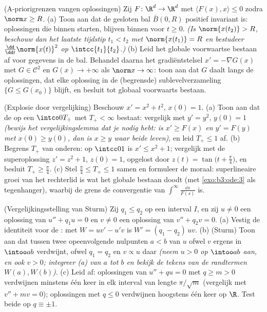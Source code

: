 \begin{exercise}[$\star\star\star$]\label{exo:b3:ode:10}
(A-priorigrenzen vangen oplossingen) Zij $F \colon \R^d \to \R^d$
 met $\langle F(x), x\rangle \leq 0$ zodra
$\norm x \geq R$.
(a) Toon aan dat de gesloten bal $\bar B(0, R)$ positief
invariant is: oplossingen die binnen starten, blijven binnen voor
$t \geq 0$. \emph{(Is $\norm{x(t_2)} > R$, beschouw dan het
laatste tijdstip $t_1 < t_2$ met $\norm{x(t_1)} = R$ en bestudeer
$\frac{\dd}{\dd t}\norm{x(t)}^2$ op $\intcc{t_1}{t_2}$.)}
(b) Leid het globale voorwaartse bestaan af voor gegevens in de
bal. Behandel daarna het gradiëntstelsel $x' = -\nabla G(x)$ met
$G \in \mathcal C^2$ en $G(x) \to +\infty$ als $\norm x \to
\infty$: toon aan dat $G$ daalt langs de oplossingen, dat elke
oplossing in de (begrensde) sublevelverzameling $\{G \leq
G(x_0)\}$ blijft, en besluit tot globaal voorwaarts bestaan.
\end{exercise}

\begin{exercise}[$\star\star$]\label{exo:b3:ode:11}
(Explosie door vergelijking) Beschouw $x' = x^2 + t^2$, $x(0) =
1$.
(a) Toon aan dat de  op een $\intco0{T_+}$ met
$T_+ < \infty$ bestaat: vergelijk met $y' = y^2$, $y(0) = 1$
\emph{(bewijs het vergelijkingslemma dat je nodig hebt: is $x'
\geq F(x)$ en $y' = F(y)$ met $x(0) \geq y(0)$, dan is $x \geq y$
waar beide leven)}, en leid $T_+ \leq 1$ af.
(b) Begrens $T_+$ van onderen: op $\intcc01$ is $x' \leq x^2 +
1$; vergelijk met de superoplossing $z' = z^2 + 1$, $z(0) = 1$,
opgelost door $z(t) = \tan\bigl(t + \frac\pi4\bigr)$, en besluit
$T_+ \geq \frac\pi4$.
(c) Stel $\frac\pi4 \leq T_+ \leq 1$ samen en formuleer de
moraal: superlineaire groei van het rechterlid is wat het globale
bestaan doodt (met \cref{exo:b3:ode:3} als tegenhanger), waarbij
de grens de convergentie van $\int^{\infty}\frac{\dd s}{F(s)}$
is.
\end{exercise}

\begin{exercise}[$\star\star\star$]\label{exo:b3:ode:12}
(Vergelijkingsstelling van Sturm) Zij $q_1 \leq q_2$  op
een interval $I$, en zij $u \neq 0$ een oplossing van $u'' + q_1u
= 0$ en $v \neq 0$ een oplossing van $v'' + q_2v = 0$.
(a) Vestig de identiteit voor de : met $W = uv' -
u'v$ is $W' = (q_1 - q_2)\,uv$.
(b) (Sturm) Toon aan dat tussen twee opeenvolgende nulpunten $a <
b$ van $u$ ofwel $v$ ergens in $\intoo ab$ verdwijnt, ofwel $q_1
= q_2$ en $v \propto u$ daar \emph{(neem $u > 0$ op $\intoo ab$
aan, en ook $v > 0$; integreer (a) van $a$ tot $b$ en bekijk de
tekens van de randtermen $W(a), W(b)$)}.
(c) Leid af: oplossingen van $u'' + qu = 0$ met $q \geq m > 0$
verdwijnen minstens één keer in elk interval van lengte
$\pi/\sqrt m$ (vergelijk met $v'' + mv = 0$); oplossingen met $q
\leq 0$ verdwijnen hoogstens één keer op $\R$. Test beide op $q
\equiv \pm1$.
\end{exercise}

